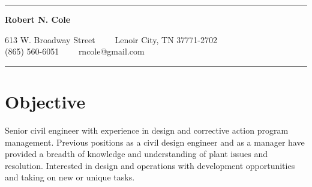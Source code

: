 \documentclass[10pt,letterpaper]{article}
\begin{document}
\chead{}
\rhead{\thepage}
\lfoot{}
\cfoot{}
\rfoot{}
\thispagestyle{empty}

\hrule
\begin{center}
{\LARGE \textbf{Robert N. Cole}}

613 W. Broadway Street\ \ \textbullet
\ \ Lenoir City, TN 37771-2702
\\
\hspace{.35em}(865) 560-6051\ \ \textbullet
\ \ rncole@gmail.com
\end{center}
\hrule
\vspace{-0.4em}

\section*{Objective}
Senior civil engineer with experience in design and corrective action program management. Previous positions as a civil design engineer and as a manager have provided a breadth of knowledge and understanding of plant issues and resolution. Interested in design and operations with development opportunities and taking on new or unique tasks.\\
\end{document}
